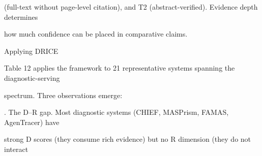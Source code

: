 \begin{flushleft}
\noindent (full-text without page-level citation), and T2 (abstract-verified). Evidence depth determines\par
\noindent how much confidence can be placed in comparative claims.\par
\par\smallskip
{} Applying DRICE\par
\noindent Table 12 applies the framework to 21 representative systems spanning the diagnostic-serving\par
\noindent spectrum. Three observations emerge:\par
{}. The D–R gap. Most diagnostic systems (CHIEF, MASPrism, FAMAS, AgenTracer) have\par
\noindent  strong D scores (they consume rich evidence) but no R dimension (they do not interact\par
\end{flushleft}
